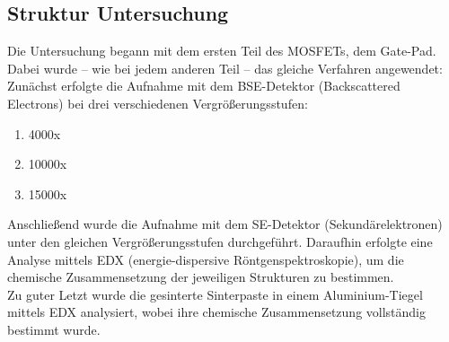 \subsection{Struktur Untersuchung}
Die Untersuchung begann mit dem ersten Teil des MOSFETs, dem Gate-Pad. Dabei wurde – wie bei jedem anderen Teil – das gleiche Verfahren angewendet: 
Zunächst erfolgte die Aufnahme mit dem BSE-Detektor (Backscattered Electrons) bei drei verschiedenen Vergrößerungsstufen:
\begin{enumerate}
    \item 4000x
    \item 10000x
    \item 15000x 
\end{enumerate}
Anschließend wurde die Aufnahme mit dem SE-Detektor (Sekundärelektronen) unter den gleichen Vergrößerungsstufen durchgeführt. 
Daraufhin erfolgte eine Analyse mittels EDX (energie-dispersive Röntgenspektroskopie), um die chemische Zusammensetzung der jeweiligen Strukturen zu bestimmen.\\
Zu guter Letzt wurde die gesinterte Sinterpaste in einem Aluminium-Tiegel mittels EDX analysiert, wobei ihre chemische Zusammensetzung vollständig bestimmt wurde.
